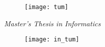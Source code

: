 \thispagestyle{empty}
\begin{titlepage}
  \begin{center}
    \begin{figure}[h!]
      \centering
      \texttt{[image: tum]}
    \end{figure}

    \vspace{1.0cm}

    {\large{}}

    {\large{}}

    \vspace{1.5cm}

    {\large{\textit{Master's Thesis in Informatics}}}

    {\huge{\mytitle}}

    \vspace{2.5cm}

    {\large{\myauthor}}

    \vspace{3.0cm}

    \begin{figure}[h!]
      \centering
      \texttt{[image: in\_tum]}
    \end{figure}
  \end{center}
\end{titlepage}

\let\cleardoublepage\clearpage

